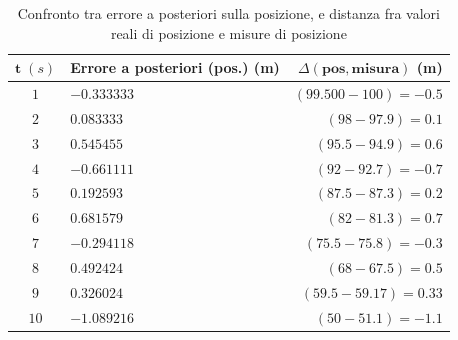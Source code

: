 \begin{table}[h]
	\begin{tabular}{|c|l|r|}
		\hline 
		$\mathbf{t}\;(s)$ & \textbf{Errore a posteriori (pos.) (m)} & $\Delta \mathbf{(pos,misura)}$ \textbf{(m)} \\ 
		\hline 
		$1$ & $-0.333333$ & $(99.500 - 100) =-0.5$ \\ 
		\hline 
		$2$ & $0.083333$ & $(98 - 97.9) = 0.1$ \\ 
		\hline 
		$3$ & $0.545455$ & $(95.5-94.9) = 0.6$ \\ 
		\hline 
		$4$ & $-0.661111$ & $(92 - 92.7) = -0.7$ \\ 
		\hline 
		$5$ &  $0.192593$ & $(87.5 - 87.3) = 0.2$ \\ 
		\hline 
		$6$ & $0.681579$ & $(82 - 81.3) = 0.7$ \\ 
		\hline 
		$7$ & $-0.294118$ & $(75.5 - 75.8) = -0.3$ \\ 
		\hline 
		$8$ & $0.492424$ & $(68 - 67.5) = 0.5$ \\ 
		\hline 
		$9$ & $0.326024$ & $(59.5 - 59.17) = 0.33$ \\ 
		\hline 
		$10$ & $-1.089216$ & $(50-51.1) = -1.1$ \\ 
		\hline 
	\end{tabular} 
	\caption{Confronto tra errore a posteriori sulla posizione, e distanza fra valori reali di posizione e misure di posizione}
	\label{tab:errorsmeas}
\end{table}
\clearpage
